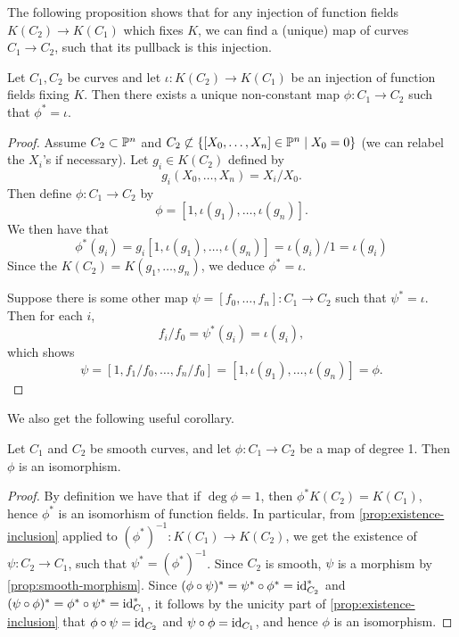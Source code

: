 The following proposition
shows that for any injection of function fields $K(C_2) \to K(C_1)$
which fixes $K$, we
can find a (unique)
map of curves $C_1 \to C_2$, such that its pullback is this
injection. 

\begin{proposition}
	\label{prop:existence-inclusion}
	Let $C_1, C_2$ be curves and
	let $\iota: K(C_2) \to K(C_1)$ be an injection of function fields
	fixing $K$. Then there exists a unique non-constant map $\phi: C_1 \to C_2$
	such that $\phi^* = \iota$.
\end{proposition}

\begin{proof}
	Assume $C_2 \subset \mathbb{P}^n$ and $C_2 \not\subset \{[X_0, \dots, X_n] \in
	\mathbb{P}^n \mid X_0 = 0\}$ (we can relabel the $X_i$'s if necessary).
	Let $g_i \in K(C_2)$ defined by 
	\begin{equation*}
		g_i(X_0, \dots, X_n) = X_i/X_0.
	\end{equation*}
	Then define $\phi: C_1 \to C_2$ by
	\begin{equation*}
		\phi = [1, \iota(g_1), \dots, \iota(g_n)].
	\end{equation*}
	We then have that
	\begin{equation*}
		\phi^*(g_i) = g_i[1, \iota(g_1), \dots, \iota(g_n)]	
		= \iota(g_i)/1 = \iota(g_i)
	\end{equation*}
	Since the $K(C_2) = K(g_1, \dots, g_n)$, we deduce
	$\phi^* = \iota$.

	Suppose there is some other map $\psi = [f_0, \dots, f_n]: C_1 \to C_2$
	such that $\psi^* = \iota$. Then for each $i$,
	\begin{equation*}
		f_i/f_0 = \psi^*(g_i) = \iota(g_i),
	\end{equation*}
	which shows
	\begin{equation*}
		\psi = [1, f_1/f_0, \dots, f_n/f_0] = [1, \iota(g_1), \dots, \iota(g_n)]
		= \phi.
	\end{equation*}
\end{proof}

We also get the following useful corollary.
\begin{corollary}
	\label{cor:deg-1-isom}
	Let $C_1$ and $C_2$ be smooth curves, and let $\phi: C_1 \to C_2$
	be a map of degree 1. Then $\phi$ is an isomorphism.
\end{corollary}

\begin{proof}
	By definition we have that if $\deg \phi = 1$, then $\phi^*K(C_2) = K(C_1)$,
	hence $\phi^*$ is an isomorhism of function fields.
	In particular, from \ref{prop:existence-inclusion} applied to
	$(\phi^*)^{-1}: K(C_1) \to K(C_2)$, we get the existence
	of $\psi: C_2 \to C_1$, such that $\psi^* = (\phi^*)^{-1}$.
	Since $C_2$ is smooth, $\psi$ is a morphism by \ref{prop:smooth-morphism}.
	Since $(\phi \circ \psi)^* = \psi^* \circ \phi^* = \operatorname{id}_{C_2}^*$
	and $(\psi\circ \phi)^* = \phi^* \circ \psi^* = \operatorname{id}_{C_1}^*$,
	it follows by the unicity part of \ref{prop:existence-inclusion}
	that $\phi\circ\psi = \operatorname{id}_{C_2}$ and $\psi\circ\phi = \operatorname{id}_{C_1}$, and
	hence $\phi$ is an isomorphism.
\end{proof}


